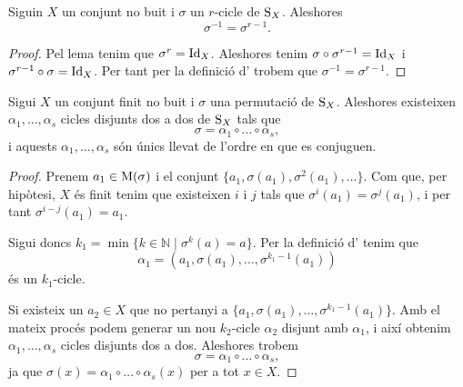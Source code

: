 \documentclass[../../Main.tex]{subfiles}
\begin{document}
	\begin{theorem}
		\label{thm:inversa d'un r-cicle}
		Siguin \(X\) un conjunt no buit i \(\sigma\) un \(r\)-cicle de \(\operatorname{S}_{X}\). Aleshores
		\[\sigma^{-1}=\sigma^{r-1}.\]
		\begin{proof}
			Pel lema  tenim que \(\sigma^{r}=\operatorname{Id}_{X}\). Aleshores tenim \(\sigma\circ\sigma^{r-1}=\operatorname{Id}_{X}\) i \(\sigma^{r-1}\circ\sigma=\operatorname{Id}_{X}\). Per tant per la definició d' trobem que \(\sigma^{-1}=\sigma^{r-1}\).
		\end{proof}
	\end{theorem}
	\begin{theorem}
		\label{thm:descomposició d'una permutació en cicles disjunts}
		Sigui \(X\) un conjunt finit no buit i \(\sigma\) una permutació de \(\operatorname{S}_{X}\). Aleshores existeixen \(\alpha_{1},\dots,\alpha_{s}\) cicles disjunts dos a dos de \(\operatorname{S}_{X}\) tals que
		\[\sigma=\alpha_{1}\circ\dots\circ\alpha_{s},\]
		i aquests \(\alpha_{1},\dots,\alpha_{s}\) són únics llevat de l'ordre en que es conjuguen.
		\begin{proof}
			Prenem \(a_{1}\in\operatorname{M}(\sigma)\) i el conjunt \(\{a_{1},\sigma(a_{1}),\sigma^{2}(a_{1}),\dots\}\). Com que, per hipòtesi, \(X\) és finit tenim que existeixen \(i\) i \(j\) tals que \(\sigma^{i}(a_{1})=\sigma^{j}(a_{1})\), i per tant \(\sigma^{i-j}(a_{1})=a_{1}\).
			
			Sigui doncs \(k_{1}=\min\{k\in\mathbb{N}\mid\sigma^{k}(a)=a\}\). Per la definició d' tenim que 
			\begin{equation}
			\label{eq:thm:descomposició de permutacions en cicles disjunts 2}
			\alpha_{1}=(a_{1},\sigma(a_{1}),\dots,\sigma^{k_{1}-1}(a_{1}))
			\end{equation}
			és un \(k_{1}\)-cicle.
			
			Si existeix un \(a_{2}\in X\) que no pertanyi a \(\{a_{1},\sigma(a_{1}),\dots,\sigma^{k_{1}-1}(a_{1})\}\). Amb el mateix procés podem generar un nou \(k_{2}\)-cicle \(\alpha_{2}\) disjunt amb \(\alpha_{1}\), i així obtenim \(\alpha_{1},\dots,\alpha_{s}\) cicles disjunts dos a dos. Aleshores trobem
			\[\sigma=\alpha_{1}\circ\dots\circ\alpha_{s},\]
			ja que \(\sigma(x)=\alpha_{1}\circ\dots\circ\alpha_{s}(x)\) per a tot \(x\in X\).
			

\end{proof}
\end{theorem}
\end{document}
